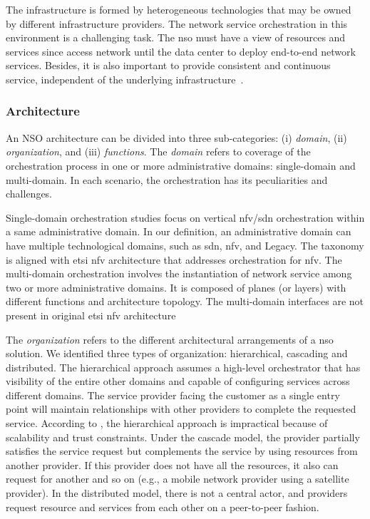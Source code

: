 The infrastructure is formed by heterogeneous technologies that may be owned by different infrastructure providers. The network service orchestration in this environment is a challenging task. The \gls{nso} must have a view of resources and services since access network until the data center to deploy end-to-end network services. Besides, it is also important to provide consistent and continuous service, independent of the underlying infrastructure~\cite{5GPPPArchitectureWorkingGroup2016ViewArchitecture}. 

\subsubsection{Architecture}
An NSO architecture can be divided into three sub-categories: (i) \textit{domain}, (ii) \textit{organization}, and (iii) \textit{functions}. The \textit{domain} refers to coverage of the orchestration process in one or more administrative domains: single-domain and multi-domain. In each scenario, the orchestration has its peculiarities and challenges.

Single-domain orchestration studies focus on vertical \gls{nfv}/\gls{sdn} orchestration within a same administrative domain. In our definition, an administrative domain can have multiple technological domains, such as \gls{sdn}, \gls{nfv}, and Legacy. The taxonomy is aligned with \gls{etsi} \gls{nfv} architecture that addresses orchestration for \gls{nfv}. The multi-domain orchestration involves the instantiation of network service among two or more administrative domains. It is composed of planes (or layers) with different functions and architecture topology. The multi-domain interfaces are not present in original \gls{etsi} \gls{nfv} architecture

The \textit{organization} refers to the different architectural arrangements of a \gls{nso} solution. We identified three types of organization: hierarchical, cascading and distributed. The hierarchical approach assumes a high-level orchestrator that has visibility of the entire other domains and capable of configuring services across different domains. The service provider facing the customer as a single entry point will maintain relationships with other providers to complete the requested service. According to \cite{Bohn2011NISTArchitecture}, the hierarchical approach is impractical because of scalability and trust constraints.  
Under the cascade model, the provider partially satisfies the service request but complements the service by using resources from another provider. If this provider does not have all the resources, it also can request for another and so on (e.g., a mobile network provider using a satellite provider). In the distributed model, there is not a central actor, and providers request resource and services from each other on a peer-to-peer fashion.


